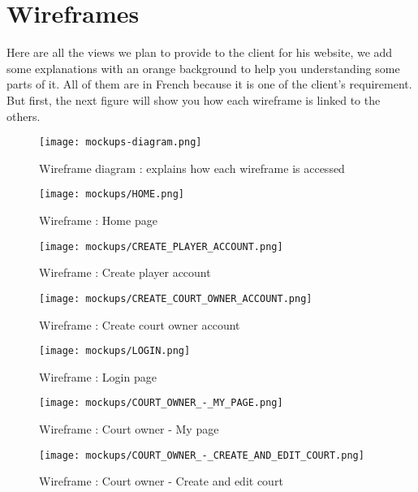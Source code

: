 \section{Wireframes}

Here are all the views we plan to provide to the client for his website, we
add some explanations with an orange background to help you understanding
some parts of it. All of them are in French because it is one of the
client's requirement. But first, the next figure will show you how each wireframe is
linked to the others.

\begin{figure}[!ht]
    \centering
    \texttt{[image: mockups-diagram.png]}
    \caption{Wireframe diagram : explains how each wireframe is accessed}
\end{figure}
\FloatBarrier

\begin{figure}[!ht]
    \centering
    \texttt{[image: mockups/HOME.png]}
    \caption{Wireframe : Home page}
\end{figure}
\FloatBarrier

\begin{figure}[!ht]
    \centering
    \texttt{[image: mockups/CREATE\_PLAYER\_ACCOUNT.png]}
    \caption{Wireframe : Create player account}
\end{figure}
\FloatBarrier

\begin{figure}[!ht]
    \centering
    \texttt{[image: mockups/CREATE\_COURT\_OWNER\_ACCOUNT.png]}
    \caption{Wireframe : Create court owner account}
\end{figure}
\FloatBarrier

\begin{figure}[!ht]
    \centering
    \texttt{[image: mockups/LOGIN.png]}
    \caption{Wireframe : Login page}
\end{figure}
\FloatBarrier

\begin{figure}[!ht]
    \centering
    \texttt{[image: mockups/COURT\_OWNER\_-\_MY\_PAGE.png]}
    \caption{Wireframe : Court owner - My page}
\end{figure}
\FloatBarrier

\begin{figure}[!ht]
    \centering
    \texttt{[image: mockups/COURT\_OWNER\_-\_CREATE\_AND\_EDIT\_COURT.png]}
    \caption{Wireframe : Court owner - Create and edit court}
\end{figure}
\FloatBarrier

